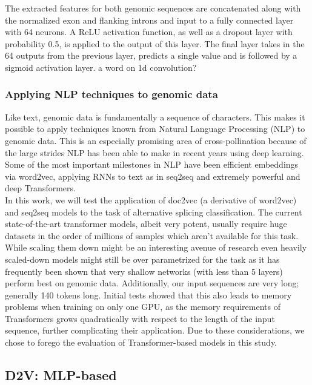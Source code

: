 The extracted features for both genomic sequences are concatenated along with the normalized exon and flanking introns and input to a fully connected layer with 64 neurons. A ReLU activation function, as well as a dropout layer with probability 0.5, is applied to the output of this layer. The final layer takes in the 64 outputs from the previous layer, predicts a single value and is followed by a sigmoid activation layer.
a word on 1d convolution?
\subsubsection{Applying NLP techniques to genomic data}
Like text, genomic data is fundamentally a sequence of characters.
This makes it possible to apply techniques known from Natural Language Processing (NLP) to genomic data. This is an especially promising area of cross-pollination because of the large strides NLP has been able to make in recent years using deep learning.
Some of the most important milestones in NLP have been efficient embeddings via word2vec, applying RNNs to text as in seq2seq and extremely powerful and deep Transformers.\\
In this work, we will test the application of doc2vec (a derivative of word2vec) and seq2seq models to the task of alternative splicing classification. The current state-of-the-art transformer models, albeit very potent, usually require huge datasets in the order of millions of samples which aren't available for this task. While scaling them down might be an interesting avenue of research even heavily scaled-down models might still be over parametrized for the task as it has frequently been shown that very shallow networks (with less than 5 layers) perform best on genomic data. Additionally, our input sequences are very long; generally 140 tokens long. Initial tests showed that this also leads to memory problems when training on only one GPU, as the memory requirements of Transformers grows quadratically with respect to the length of the input sequence, further complicating their application. Due to these considerations, we chose to forego the evaluation of Transformer-based models in this study.
\subsection{D2V: MLP-based} \label{subsec:d2v}

